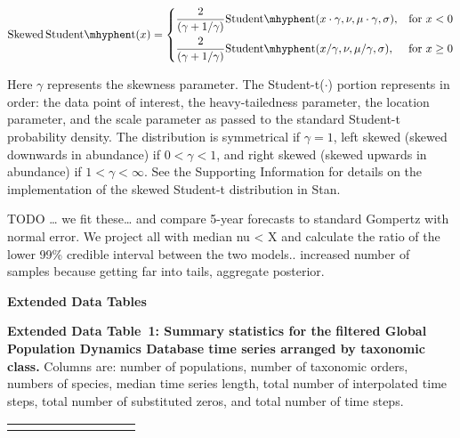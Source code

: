 \begin{equation}
  \mathrm{Skewed\,Student\mhyphen t}(x) =
\begin{dcases}
\frac{2}{(\gamma + 1/\gamma)}
         \mathrm{Student\mhyphen t}(x \cdot \gamma, \nu, \mu \cdot \gamma, \sigma),& \text{for } x < 0\\
       \frac{2}{(\gamma + 1/\gamma)}
         \mathrm{Student\mhyphen t}(x / \gamma, \nu, \mu / \gamma, \sigma),& \text{for } x \ge 0
\end{dcases}
\end{equation}

Here \(\gamma\) represents the skewness parameter. The Student-t(\(\cdot\)) portion represents in order: the data point of interest, the heavy-tailedness parameter, the location parameter, and the scale parameter as passed to the standard Student-t probability density. The distribution is symmetrical if \(\gamma = 1\), left skewed (skewed downwards in abundance) if \(0 < \gamma < 1\), and right skewed (skewed upwards in abundance) if \(1 < \gamma < \infty\). See the Supporting Information for details on the implementation of the skewed Student-t distribution in Stan.

TODO \ldots{} we fit these\ldots{} and compare 5-year forecasts to standard Gompertz with normal error. We project all with median nu \textless{} X and calculate the ratio of the lower 99\% credible interval between the two models.. increased number of samples because getting far into tails, aggregate posterior.

\clearpage

\textbf{Extended Data Tables}

\newenvironment{helvetica}{\fontfamily{phv}\selectfont}{\par}

\singlespacing

\textbf{Extended Data Table~1: Summary statistics for the filtered Global Population Dynamics Database time series arranged by taxonomic class.} Columns are: number of populations, number of taxonomic orders, numbers of species, median time series length, total number of interpolated time steps, total number of substituted zeros, and total number of time steps.

\onehalfspacing

\begin{helvetica}
\smallskip
\begin{scriptsize}
\begin{tabular}{lrrrrrrrr}
\toprule

\label{tab:stats}
\end{tabular}
\end{scriptsize}
\end{helvetica}

